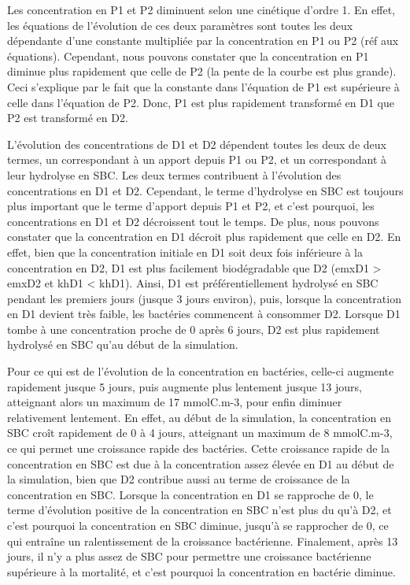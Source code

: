 \par{
Les concentration en P1 et P2 diminuent selon une cin\'etique d'ordre 1. En effet, les \'equations de l'\'evolution de ces deux param\`etres sont toutes les deux d\'ependante d'une constante multipli\'ee par la concentration en P1 ou P2 (r\'ef aux \'equations). Cependant, nous pouvons constater que la concentration en P1 diminue plus rapidement que celle de P2 (la pente de la courbe est plus grande). Ceci s'explique par le fait que la constante dans l'\'equation de P1 est sup\'erieure \`a celle dans l'\'equation de P2. Donc, P1 est plus rapidement transform\'e en D1 que P2 est transform\'e en D2.
}
\par{
L'\'evolution des concentrations de D1 et D2 d\'ependent toutes les deux de deux termes, un correspondant \`a un apport depuis P1 ou P2, et un correspondant \`a leur hydrolyse en SBC. Les deux termes contribuent \`a l'\'evolution des concentrations en D1 et D2. Cependant, le terme d'hydrolyse en SBC est toujours plus important que le terme d'apport depuis P1 et P2, et c'est pourquoi, les concentrations en D1 et D2 d\'ecroissent tout le temps. De plus, nous pouvons constater que la concentration en D1 d\'ecroit plus rapidement que celle en D2. En effet, bien que la concentration initiale en D1 soit deux fois inf\'erieure \`a la concentration en D2, D1 est plus facilement biod\'egradable que D2 (emxD1 > emxD2 et khD1 < khD1). Ainsi, D1 est pr\'ef\'erentiellement hydrolys\'e en SBC pendant les premiers jours (jusque 3 jours environ), puis, lorsque la concentration en D1 devient tr\`es faible, les bact\'eries commencent \`a consommer D2. Lorsque D1 tombe \`a une concentration proche de 0 apr\`es 6 jours, D2 est plus rapidement hydrolys\'e en SBC qu'au d\'ebut de la simulation.
}
\par{
Pour ce qui est de l'\'evolution de la concentration en bact\'eries, celle-ci augmente rapidement jusque 5 jours, puis augmente plus lentement jusque 13 jours, atteignant alors un maximum de 17 mmolC.m-3, pour enfin diminuer relativement lentement. En effet, au d\'ebut de la simulation, la concentration en SBC cro\^it rapidement de 0 \`a 4 jours, atteignant un maximum de 8 mmolC.m-3, ce qui permet une croissance rapide des bact\'eries. Cette croissance rapide de la concentration en SBC est due \`a la concentration assez \'elev\'ee en D1 au d\'ebut de la simulation, bien que D2 contribue aussi au terme de croissance de la concentration en SBC. Lorsque la concentration en D1 se rapproche de 0, le terme d'\'evolution positive de la concentration en SBC n'est plus du qu'\`a D2, et c'est pourquoi la concentration en SBC diminue, jusqu'\`a se rapprocher de 0, ce qui entra\^ine un ralentissement de la croissance bact\'erienne. Finalement, apr\`es 13 jours, il n'y a plus assez de SBC pour permettre une croissance bact\'erienne sup\'erieure \`a la mortalit\'e, et c'est pourquoi la concentration en bact\'erie diminue.
}
